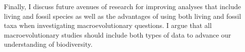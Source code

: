 Finally, I discuss future avenues of research for improving analyses that include living and fossil species as well as the advantages of using both living and fossil taxa when investigating macroevolutionary questions. 
I argue that all macroevolutionary studies should include both types of data to advance our understanding of biodiversity.






